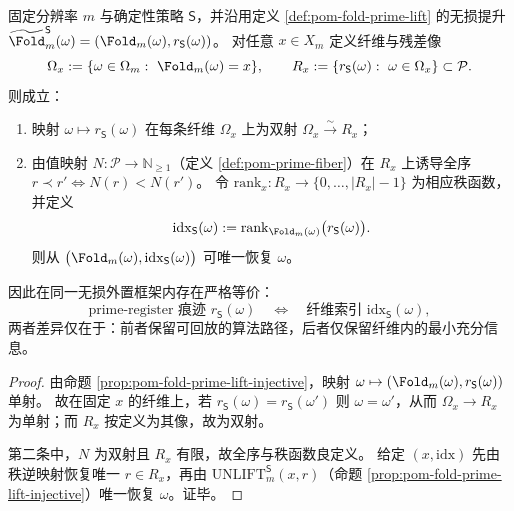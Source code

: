 \begin{proposition}\label{prop:pom-prime-trace-index-duality}
固定分辨率 \(m\) 与确定性策略 \(\mathsf S\)，并沿用定义 \ref{def:pom-fold-prime-lift} 的无损提升
\(
\widetilde{\Fold}^{\mathsf S}_m(\omega)=(\Fold_m(\omega),r_{\mathsf S}(\omega))
\)。
对任意 \(x\in X_m\) 定义纤维与残差像
\[
\Omega_x:=\{\omega\in\Omega_m:\ \Fold_m(\omega)=x\},
\qquad
R_x:=\{r_{\mathsf S}(\omega):\ \omega\in\Omega_x\}\subset \mathcal{P}.
\]
则成立：
\begin{enumerate}
  \item 映射 \(\omega\mapsto r_{\mathsf S}(\omega)\) 在每条纤维 \(\Omega_x\) 上为双射 \(\Omega_x\xrightarrow{\sim}R_x\)；
  \item 由值映射 \(N:\mathcal{P}\to\mathbb{N}_{\ge 1}\)（定义 \ref{def:pom-prime-fiber}）在 \(R_x\) 上诱导全序
  \(
  r\prec r'\iff N(r)<N(r')
  \)。
  令 \(\mathrm{rank}_x:R_x\to\{0,\dots,|R_x|-1\}\) 为相应秩函数，并定义
  \[
  \mathrm{idx}_{\mathsf S}(\omega):=\mathrm{rank}_{\Fold_m(\omega)}\bigl(r_{\mathsf S}(\omega)\bigr).
  \]
  则从 \(\bigl(\Fold_m(\omega),\mathrm{idx}_{\mathsf S}(\omega)\bigr)\) 可唯一恢复 \(\omega\)。
\end{enumerate}
因此在同一无损外置框架内存在严格等价：
\[
\text{prime-register 痕迹 }r_{\mathsf S}(\omega)
\quad\Longleftrightarrow\quad
\text{纤维索引 }\mathrm{idx}_{\mathsf S}(\omega),
\]
两者差异仅在于：前者保留可回放的算法路径，后者仅保留纤维内的最小充分信息。
\end{proposition}
\begin{proof}
由命题 \ref{prop:pom-fold-prime-lift-injective}，映射 \(\omega\mapsto (\Fold_m(\omega),r_{\mathsf S}(\omega))\) 单射。
故在固定 \(x\) 的纤维上，若 \(r_{\mathsf S}(\omega)=r_{\mathsf S}(\omega')\) 则 \(\omega=\omega'\)，从而 \(\Omega_x\to R_x\) 为单射；而 \(R_x\) 按定义为其像，故为双射。
\par
第二条中，\(N\) 为双射且 \(R_x\) 有限，故全序与秩函数良定义。
给定 \((x,\mathrm{idx})\) 先由秩逆映射恢复唯一 \(r\in R_x\)，再由 \(\mathrm{UNLIFT}^{\mathsf S}_m(x,r)\)（命题 \ref{prop:pom-fold-prime-lift-injective}）唯一恢复 \(\omega\)。证毕。
\end{proof}

